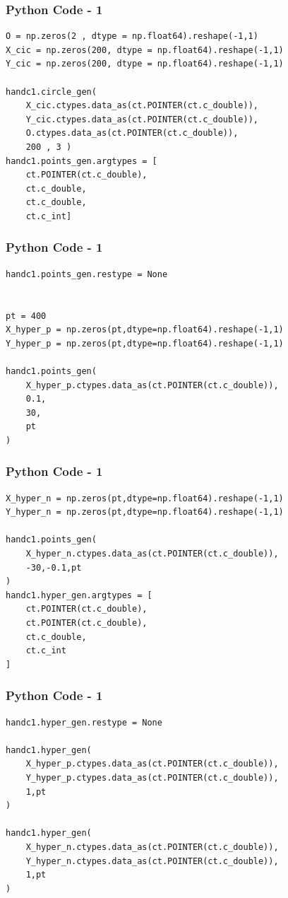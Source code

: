 \documentclass{beamer}
\begin{document}
\begin{frame}[fragile]
    \frametitle{Python Code - 1}
    \begin{lstlisting}
O = np.zeros(2 , dtype = np.float64).reshape(-1,1)
X_cic = np.zeros(200, dtype = np.float64).reshape(-1,1)
Y_cic = np.zeros(200, dtype = np.float64).reshape(-1,1)

handc1.circle_gen(
    X_cic.ctypes.data_as(ct.POINTER(ct.c_double)),
    Y_cic.ctypes.data_as(ct.POINTER(ct.c_double)),
    O.ctypes.data_as(ct.POINTER(ct.c_double)),
    200 , 3 )
handc1.points_gen.argtypes = [
    ct.POINTER(ct.c_double),
    ct.c_double,
    ct.c_double,
    ct.c_int]
\end{lstlisting}
\end{frame}


\begin{frame}[fragile]
    \frametitle{Python Code - 1}
    \begin{lstlisting}
handc1.points_gen.restype = None


pt = 400
X_hyper_p = np.zeros(pt,dtype=np.float64).reshape(-1,1)
Y_hyper_p = np.zeros(pt,dtype=np.float64).reshape(-1,1)

handc1.points_gen(
    X_hyper_p.ctypes.data_as(ct.POINTER(ct.c_double)),
    0.1,
    30,
    pt 
)

\end{lstlisting}
\end{frame}

\begin{frame}[fragile]
    \frametitle{Python Code - 1}
    \begin{lstlisting}
X_hyper_n = np.zeros(pt,dtype=np.float64).reshape(-1,1)
Y_hyper_n = np.zeros(pt,dtype=np.float64).reshape(-1,1)

handc1.points_gen(
    X_hyper_n.ctypes.data_as(ct.POINTER(ct.c_double)),
    -30,-0.1,pt
)
handc1.hyper_gen.argtypes = [
    ct.POINTER(ct.c_double),
    ct.POINTER(ct.c_double),
    ct.c_double,
    ct.c_int 
]
\end{lstlisting}
\end{frame}


\begin{frame}[fragile]
    \frametitle{Python Code - 1}
    \begin{lstlisting}
handc1.hyper_gen.restype = None

handc1.hyper_gen(
    X_hyper_p.ctypes.data_as(ct.POINTER(ct.c_double)),
    Y_hyper_p.ctypes.data_as(ct.POINTER(ct.c_double)),
    1,pt
)

handc1.hyper_gen(
    X_hyper_n.ctypes.data_as(ct.POINTER(ct.c_double)),
    Y_hyper_n.ctypes.data_as(ct.POINTER(ct.c_double)),
    1,pt
)

\end{lstlisting}
\end{frame}
\end{document}
